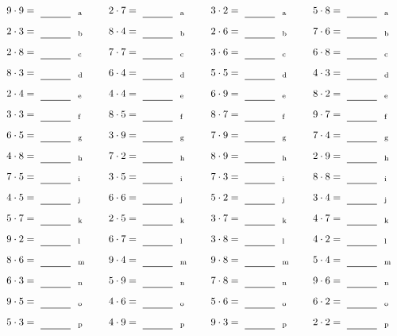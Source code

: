 \documentclass
[
  draft    = true,
  fontsize = 11pt,
  parskip  = half-
]
{scrartcl}
\begin{document}
\par\vfill\par
\begin{align*}
    \pline{9\cdot9}&=\rline{a}
  & \pline{2\cdot7}&=\rline{a}
  & \pline{3\cdot2}&=\rline{a}
  & \pline{5\cdot8}&=\rline{a} \\[1ex]
    \pline{2\cdot3}&=\rline{b}
  & \pline{8\cdot4}&=\rline{b}
  & \pline{2\cdot6}&=\rline{b}
  & \pline{7\cdot6}&=\rline{b} \\[1ex]
    \pline{2\cdot8}&=\rline{c}
  & \pline{7\cdot7}&=\rline{c}
  & \pline{3\cdot6}&=\rline{c}
  & \pline{6\cdot8}&=\rline{c} \\[1ex]
    \pline{8\cdot3}&=\rline{d}
  & \pline{6\cdot4}&=\rline{d}
  & \pline{5\cdot5}&=\rline{d}
  & \pline{4\cdot3}&=\rline{d} \\[1ex]
    \pline{2\cdot4}&=\rline{e}
  & \pline{4\cdot4}&=\rline{e}
  & \pline{6\cdot9}&=\rline{e}
  & \pline{8\cdot2}&=\rline{e} \\[1ex]
    \pline{3\cdot3}&=\rline{f}
  & \pline{8\cdot5}&=\rline{f}
  & \pline{8\cdot7}&=\rline{f}
  & \pline{9\cdot7}&=\rline{f} \\[1ex]
    \pline{6\cdot5}&=\rline{g}
  & \pline{3\cdot9}&=\rline{g}
  & \pline{7\cdot9}&=\rline{g}
  & \pline{7\cdot4}&=\rline{g} \\[1ex]
    \pline{4\cdot8}&=\rline{h}
  & \pline{7\cdot2}&=\rline{h}
  & \pline{8\cdot9}&=\rline{h}
  & \pline{2\cdot9}&=\rline{h} \\[1ex]
    \pline{7\cdot5}&=\rline{i}
  & \pline{3\cdot5}&=\rline{i}
  & \pline{7\cdot3}&=\rline{i}
  & \pline{8\cdot8}&=\rline{i} \\[1ex]
    \pline{4\cdot5}&=\rline{j}
  & \pline{6\cdot6}&=\rline{j}
  & \pline{5\cdot2}&=\rline{j}
  & \pline{3\cdot4}&=\rline{j} \\[1ex]
    \pline{5\cdot7}&=\rline{k}
  & \pline{2\cdot5}&=\rline{k}
  & \pline{3\cdot7}&=\rline{k}
  & \pline{4\cdot7}&=\rline{k} \\[1ex]
    \pline{9\cdot2}&=\rline{l}
  & \pline{6\cdot7}&=\rline{l}
  & \pline{3\cdot8}&=\rline{l}
  & \pline{4\cdot2}&=\rline{l} \\[1ex]
    \pline{8\cdot6}&=\rline{m}
  & \pline{9\cdot4}&=\rline{m}
  & \pline{9\cdot8}&=\rline{m}
  & \pline{5\cdot4}&=\rline{m} \\[1ex]
    \pline{6\cdot3}&=\rline{n}
  & \pline{5\cdot9}&=\rline{n}
  & \pline{7\cdot8}&=\rline{n}
  & \pline{9\cdot6}&=\rline{n} \\[1ex]
    \pline{9\cdot5}&=\rline{o}
  & \pline{4\cdot6}&=\rline{o}
  & \pline{5\cdot6}&=\rline{o}
  & \pline{6\cdot2}&=\rline{o} \\[1ex]
    \pline{5\cdot3}&=\rline{p}
  & \pline{4\cdot9}&=\rline{p}
  & \pline{9\cdot3}&=\rline{p}
  & \pline{2\cdot2}&=\rline{p}
\end{align*}
\end{document}
